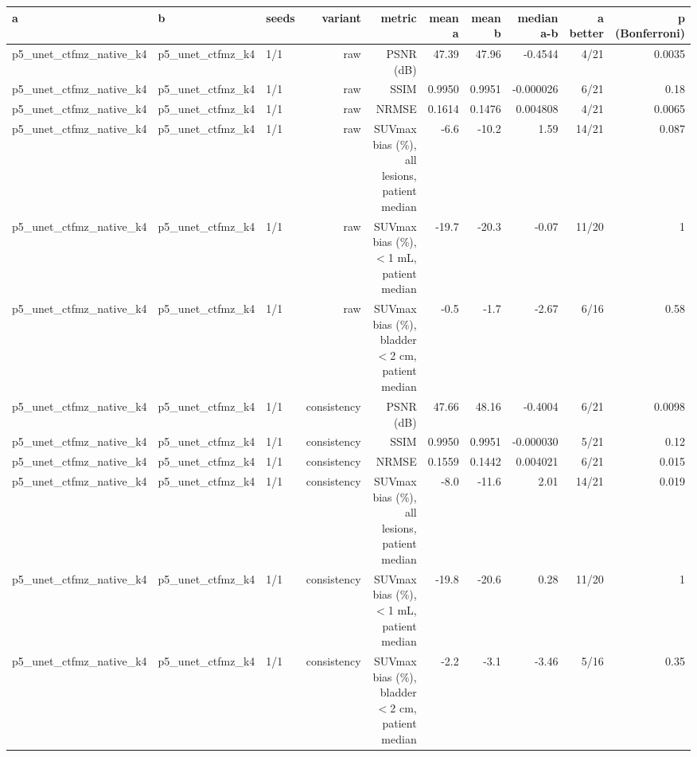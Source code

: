 \begin{tabular}{lllrrrrrrr}
\toprule
a & b & seeds & variant & metric & mean a & mean b & median a-b & a better & p (Bonferroni) \\
\midrule
p5\_unet\_ctfmz\_native\_k4 & p5\_unet\_ctfmz\_k4 & 1/1 & raw & PSNR (dB) & 47.39 & 47.96 & -0.4544 & 4/21 & 0.0035 \\
p5\_unet\_ctfmz\_native\_k4 & p5\_unet\_ctfmz\_k4 & 1/1 & raw & SSIM & 0.9950 & 0.9951 & -0.000026 & 6/21 & 0.18 \\
p5\_unet\_ctfmz\_native\_k4 & p5\_unet\_ctfmz\_k4 & 1/1 & raw & NRMSE & 0.1614 & 0.1476 & 0.004808 & 4/21 & 0.0065 \\
p5\_unet\_ctfmz\_native\_k4 & p5\_unet\_ctfmz\_k4 & 1/1 & raw & SUVmax bias (\%), all lesions, patient median & -6.6 & -10.2 & 1.59 & 14/21 & 0.087 \\
p5\_unet\_ctfmz\_native\_k4 & p5\_unet\_ctfmz\_k4 & 1/1 & raw & SUVmax bias (\%), $<$1 mL, patient median & -19.7 & -20.3 & -0.07 & 11/20 & 1 \\
p5\_unet\_ctfmz\_native\_k4 & p5\_unet\_ctfmz\_k4 & 1/1 & raw & SUVmax bias (\%), bladder $<$2 cm, patient median & -0.5 & -1.7 & -2.67 & 6/16 & 0.58 \\
p5\_unet\_ctfmz\_native\_k4 & p5\_unet\_ctfmz\_k4 & 1/1 & consistency & PSNR (dB) & 47.66 & 48.16 & -0.4004 & 6/21 & 0.0098 \\
p5\_unet\_ctfmz\_native\_k4 & p5\_unet\_ctfmz\_k4 & 1/1 & consistency & SSIM & 0.9950 & 0.9951 & -0.000030 & 5/21 & 0.12 \\
p5\_unet\_ctfmz\_native\_k4 & p5\_unet\_ctfmz\_k4 & 1/1 & consistency & NRMSE & 0.1559 & 0.1442 & 0.004021 & 6/21 & 0.015 \\
p5\_unet\_ctfmz\_native\_k4 & p5\_unet\_ctfmz\_k4 & 1/1 & consistency & SUVmax bias (\%), all lesions, patient median & -8.0 & -11.6 & 2.01 & 14/21 & 0.019 \\
p5\_unet\_ctfmz\_native\_k4 & p5\_unet\_ctfmz\_k4 & 1/1 & consistency & SUVmax bias (\%), $<$1 mL, patient median & -19.8 & -20.6 & 0.28 & 11/20 & 1 \\
p5\_unet\_ctfmz\_native\_k4 & p5\_unet\_ctfmz\_k4 & 1/1 & consistency & SUVmax bias (\%), bladder $<$2 cm, patient median & -2.2 & -3.1 & -3.46 & 5/16 & 0.35 \\
\bottomrule
\end{tabular}
